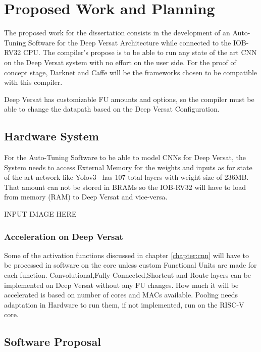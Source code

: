 \chapter{Proposed Work and Planning}
\label{chapter:PWP}

\quad The proposed work for the dissertation consists in the development of an Auto-Tuning Software for the Deep Versat Architecture
while connected to the IOB-RV32 CPU.
The compiler's propose is to be able to run any state of the art CNN on the Deep Versat system with no effort on the user side. For the proof of concept
stage, Darknet and Caffe will be the frameworks chosen to be compatible with this compiler.

Deep Versat has customizable FU amounts and options, so the compiler must be able to change the datapath based on the Deep Versat Configuration.
  

\section{Hardware System}

\quad For the Auto-Tuning Software to be able to model CNNs for Deep Versat, the System needs to access External Memory for the weights and inputs as for state of the art network like 
Yolov3~\cite{yolov3} has 107 total layers with weight size of 236MB. That amount can not be stored in BRAMs so the IOB-RV32 will have
to load from memory (RAM) to Deep Versat and vice-versa.

INPUT IMAGE HERE 


\subsection{Acceleration on Deep Versat}

\quad Some of the activation functions discussed in chapter \ref{chapter:cnn} will have to be processed in software on the core unless
custom Functional Units are made for each function. Convolutional,Fully Connected,Shortcut and Route layers can be implemented on Deep Versat without
any FU changes. How much it will be accelerated is based on number of cores and MACs available. Pooling needs adaptation in Hardware to run them, if not implemented, run on the RISC-V core.


\newpage
\section{Software Proposal}


